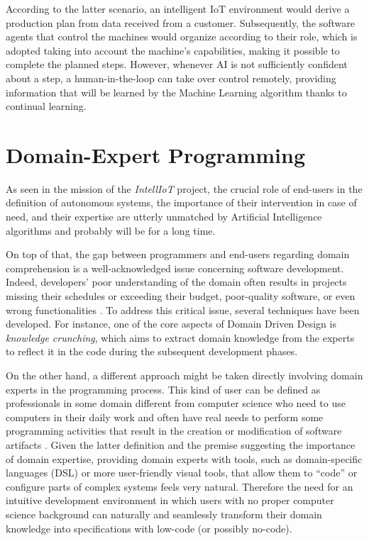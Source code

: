 \begin{itemize}
    According to the latter scenario, an intelligent IoT environment would derive a production plan from data received from a customer.
    Subsequently, the software agents that control the machines would organize according to their role, which is adopted taking into account the machine's capabilities, making it possible to complete the planned steps.
    However, whenever AI is not sufficiently confident about a step, a human-in-the-loop can take over control remotely, providing information that will be learned by the Machine Learning algorithm thanks to continual learning.
\end{itemize}

\section{Domain-Expert Programming}
As seen in the mission of the \textit{IntellIoT} project, the crucial role of end-users in the definition of autonomous systems, the importance of their intervention in case of need, and their expertise are utterly unmatched by Artificial Intelligence algorithms and probably will be for a long time.

On top of that, the gap between programmers and end-users regarding domain comprehension is a well-acknowledged issue concerning software development.
Indeed, developers' poor understanding of the domain often results in projects missing their schedules or exceeding their budget, poor-quality software, or even wrong functionalities \cite{5089292}.
To address this critical issue, several techniques have been developed.
For instance, one of the core aspects of Domain Driven Design is \textit{knowledge crunching}, which aims to extract domain knowledge from the experts to reflect it in the code during the subsequent development phases.

On the other hand, a different approach might be taken directly involving domain experts in the programming process.
This kind of user can be defined as professionals in some domain different from computer science who need to use computers in their daily work and often have real needs to perform some programming activities that result in the creation or modification of software artifacts \cite{costabile2003domain}.
Given the latter definition and the premise suggesting the importance of domain expertise, providing domain experts with tools, such as domain-specific languages (DSL) or more user-friendly visual tools, that allow them to ``code'' or configure parts of complex systems feels very natural.
Therefore the need for an intuitive development environment in which users with no proper computer science background can naturally and seamlessly transform their domain knowledge into specifications with low-code (or possibly no-code).

